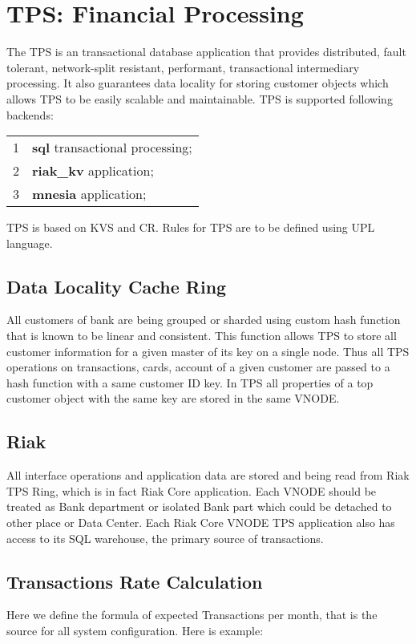 \section{TPS: Financial Processing}
The TPS is an transactional database application that
provides distributed, fault tolerant, network-split
resistant, performant, transactional intermediary processing.
It also guarantees data locality for storing customer objects which allows
TPS to be easily scalable and maintainable. TPS is supported following backends:

\vspace{0.5cm}
\begin{tabular}{ll}
1 & {\bf sql} transactional processing;\\
2 & {\bf riak\_kv} application;\\
3 & {\bf mnesia} application;\\
\end{tabular}
\vspace{0.5cm}

TPS is based on KVS and CR. Rules for TPS are to be
defined using UPL language.

\subsection{Data Locality Cache Ring}
All customers of bank are being grouped or sharded using custom
hash function that is known to be linear and consistent.
This function allows TPS to store all customer information for
a given master of its key on a single node. Thus all TPS operations
on transactions, cards, account of a given customer are passed
to a hash function with a same customer ID key. In TPS all properties of
a top customer object with the same key are stored in the same VNODE.

\subsection{Riak}
All interface operations and application data are stored and
being read from Riak TPS Ring, which is in fact Riak Core application.
Each VNODE should be treated as Bank department or isolated Bank part
which could be detached to other place or Data Center.
Each Riak Core VNODE TPS application also has access to its SQL warehouse,
the primary source of transactions.

\newpage
\subsection{Transactions Rate Calculation}
Here we define the formula of expected Transactions per month,
that is the source for all system configuration. Here is example:

